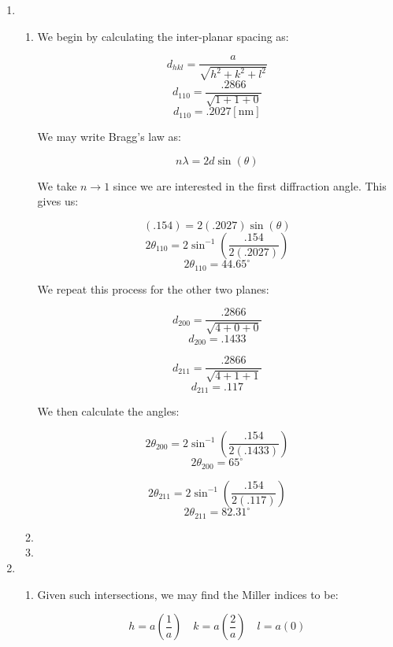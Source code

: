 \begin{enumerate}

  \item

    \begin{enumerate}

      \item We begin by calculating the inter-planar spacing as:

        $$d_{hkl}=\frac{a}{\sqrt{h^2+k^2+l^2}}$$
        $$d_{110}=\frac{.2866}{\sqrt{1+1+0}}$$
        $$\boxed{d_{110}=.2027[\si{\nano\meter}]}$$

        We may write Bragg's law as:

        $$n\lambda=2d\sin(\theta)$$

        We take $n\to1$ since we are interested in the first diffraction angle. This gives us:

        $$(.154)=2(.2027)\sin(\theta)$$
        $$2\theta_{110}=2\sin^{-1}\left( \frac{.154}{2(.2027)} \right)$$
        $$\boxed{2\theta_{110}=44.65^{\circ}}$$

        We repeat this process for the other two planes:
        
        $$d_{200}=\frac{.2866}{\sqrt{4+0+0}}$$
        $$\boxed{d_{200}=.1433}$$

        $$d_{211}=\frac{.2866}{\sqrt{4+1+1}}$$
        $$\boxed{d_{211}=.117}$$

        We then calculate the angles:

        $$2\theta_{200}=2\sin^{-1}\left( \frac{.154}{2(.1433)} \right)$$
        $$\boxed{2\theta_{200}=65^{\circ}}$$

        $$2\theta_{211}=2\sin^{-1}\left( \frac{.154}{2(.117)} \right)$$
        $$\boxed{2\theta_{211}=82.31^{\circ}}$$

      \item 

      \item 

    \end{enumerate}

  \item

    \begin{enumerate}

      \item Given such intersections, we may find the Miller indices to be:

        $$h=a\left( \frac{1}{a} \right)\quad k=a\left( \frac{2}{a} \right)\quad l=a(0)$$


\end{enumerate}
\end{enumerate}
